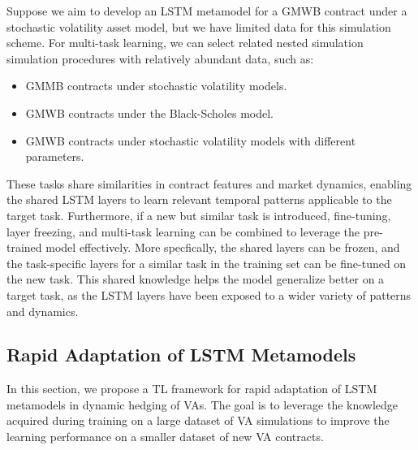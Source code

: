 Suppose we aim to develop an LSTM metamodel for a GMWB contract under a stochastic volatility asset model, but we have limited data for this simulation scheme. 
For multi-task learning, we can select related nested simulation simulation procedures with relatively abundant data, such as:

\begin{itemize} 
    \item GMMB contracts under stochastic volatility models. 
    \item GMWB contracts under the Black-Scholes model. 
    \item GMWB contracts under stochastic volatility models with different parameters.
\end{itemize}

These tasks share similarities in contract features and market dynamics, enabling the shared LSTM layers to learn relevant temporal patterns applicable to the target task.
Furthermore, if a new but similar task is introduced, fine-tuning, layer freezing, and multi-task learning can be combined to leverage the pre-trained model effectively.
More specfically, the shared layers can be frozen, and the task-specific layers for a similar task in the training set can be fine-tuned on the new task.
This shared knowledge helps the model generalize better on a target task, as the LSTM layers have been exposed to a wider variety of patterns and dynamics.

\subsection{Rapid Adaptation of LSTM Metamodels} \label{sec3:transfer_learning}

In this section, we propose a TL framework for rapid adaptation of LSTM metamodels in dynamic hedging of VAs.
The goal is to leverage the knowledge acquired during training on a large dataset of VA simulations to improve the learning performance on a smaller dataset of new VA contracts.


